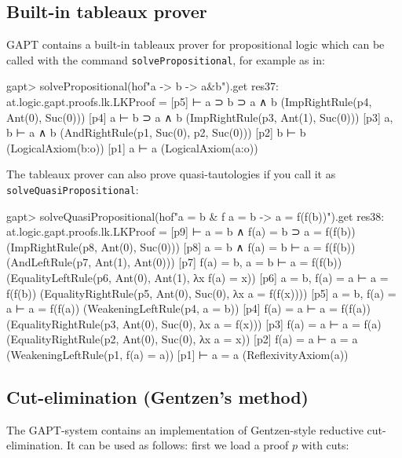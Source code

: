 \documentclass[a4paper,11pt]{article}
\begin{document}
\subsection{Built-in tableaux prover}

GAPT contains a built-in tableaux prover for propositional logic
which can be called with the command \texttt{solvePropositional}, for example as in:
\begin{clilisting}
gapt> solvePropositional(hof"a -> b -> a&b").get
res37: at.logic.gapt.proofs.lk.LKProof =
[p5]  ⊢ a ⊃ b ⊃ a ∧ b    (ImpRightRule(p4, Ant(0), Suc(0)))
[p4] a ⊢ b ⊃ a ∧ b    (ImpRightRule(p3, Ant(1), Suc(0)))
[p3] a, b ⊢ a ∧ b    (AndRightRule(p1, Suc(0), p2, Suc(0)))
[p2] b ⊢ b    (LogicalAxiom(b:o))
[p1] a ⊢ a    (LogicalAxiom(a:o))

\end{clilisting}

The tableaux prover can also prove quasi-tautologies if you call it as \texttt{solveQuasiPropositional}:
\begin{clilisting}
gapt> solveQuasiPropositional(hof"a = b & f a = b -> a = f(f(b))").get
res38: at.logic.gapt.proofs.lk.LKProof =
[p9]  ⊢ a = b ∧ f(a) = b ⊃ a = f(f(b))    (ImpRightRule(p8, Ant(0), Suc(0)))
[p8] a = b ∧ f(a) = b ⊢ a = f(f(b))    (AndLeftRule(p7, Ant(1), Ant(0)))
[p7] f(a) = b, a = b ⊢ a = f(f(b))    (EqualityLeftRule(p6, Ant(0), Ant(1), λx f(a) = x))
[p6] a = b, f(a) = a ⊢ a = f(f(b))    (EqualityRightRule(p5, Ant(0), Suc(0), λx a = f(f(x))))
[p5] a = b, f(a) = a ⊢ a = f(f(a))    (WeakeningLeftRule(p4, a = b))
[p4] f(a) = a ⊢ a = f(f(a))    (EqualityRightRule(p3, Ant(0), Suc(0), λx a = f(x)))
[p3] f(a) = a ⊢ a = f(a)    (EqualityRightRule(p2, Ant(0), Suc(0), λx a = x))
[p2] f(a) = a ⊢ a = a    (WeakeningLeftRule(p1, f(a) = a))
[p1]  ⊢ a = a    (ReflexivityAxiom(a))

\end{clilisting}

\subsection{Cut-elimination (Gentzen's method)}

The GAPT-system contains an implementation of Gentzen-style reductive
cut-elimination.  It can be used as follows: first we load a proof $p$ with
cuts:
\end{document}
